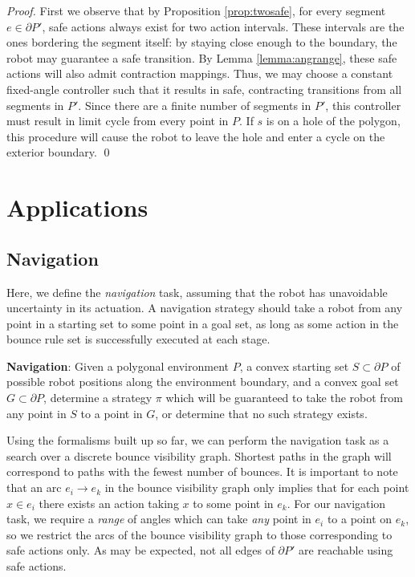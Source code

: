 \documentclass[]{styles/svproc}  %
\begin{document}
\begin{proof}
First we observe that by Proposition \ref{prop:twosafe}, for every segment $e
\in \partial P'$, 
safe actions always exist
for two action intervals. These intervals are the ones bordering the segment itself:
by staying close enough to the boundary, the robot may guarantee a safe
transition. By Lemma \ref{lemma:angrange}, these safe actions will also
admit contraction mappings. Thus, we may choose a constant fixed-angle
controller such that it results in safe, contracting transitions from all
segments in $P'$. Since there are a finite number of segments in $P'$, this
controller must result in limit cycle from every point in $P$. If $s$ is on a
hole of the polygon, this procedure will cause the robot to leave the hole and
enter a cycle on the exterior boundary. \qed
\end{proof}

\section{Applications}

\subsection{Navigation}

Here, we define the \emph{navigation} task, assuming that
the robot has unavoidable uncertainty in its actuation. 
A navigation strategy should take a robot
from any point in a starting set to some point in a goal set, as long as some
action in the bounce rule set is successfully executed at each stage. 

\begin{definition}
\textbf{Navigation}:
Given a polygonal environment $P$, a convex starting set $S \subset \partial P$ of possible robot positions along the
environment boundary, and a convex goal set $G \subset \partial P$, determine a strategy $\pi$ which
will be guaranteed to take the robot from any point in $S$ to a point in $G$, or
determine that no such strategy exists.
\end{definition}

Using the formalisms built up so far, we can perform the navigation task as a
search over a discrete bounce visibility graph. Shortest paths in the graph 
will correspond to paths with the fewest number of bounces. It is important to
note that an arc $e_i \to e_k$ in the bounce visibility graph only implies that for each
point $x \in e_i$ there exists an action taking $x$ to some point in $e_k$. For
our navigation task, we require a {\em range} of angles which can take {\em any}
point in $e_i$ to a point on $e_k$, so we restrict the arcs of the bounce
visibility graph to those corresponding to safe actions only. As may be
expected, not all edges of $\partial P'$ are reachable using safe actions.
\end{document}
